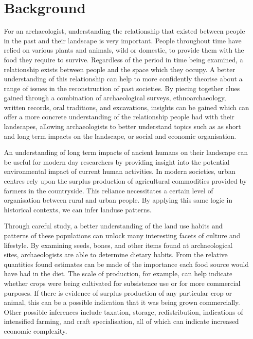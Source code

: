 \section{Background} 

  For an archaeologist, understanding the relationship that existed between
  people in the past and their landscape is very important.  People throughout
  time have relied on various plants and animals, wild or domestic, to provide
  them with the food they require to survive.  Regardless of the period in time
  being examined, a relationship exists between people and the space which they
  occupy.  A better understanding of this relationship can help to more
  confidently theorise about a range of issues in the reconstruction of past
  societies.  By piecing together clues gained through a combination of
  archaeological surveys, ethnoarchaeology, written records, oral traditions, and
  excavations, insights can be gained which can offer a more concrete
  understanding of the relationship people had with their landscapes, allowing
  archaeologists to better understand topics such as as short and long term
  impacts on the landscape, or social and economic organisation. 
  
  An understanding of long term impacts of ancient humans on their landscape can 
  be useful for modern day researchers by providing insight into the potential 
  environmental impact of current human activities. In modern societies, urban 
  centres rely upon the surplus production of agricultural commodities provided 
  by farmers in the countryside.  This reliance necessitates a certain level of 
  organisation between rural and urban people.  By applying this same logic in 
  historical contexts, we can infer landuse patterns.
  
  Through careful study, a better understanding of the land use habits and
  patterns of these populations can unlock many interesting facets of culture and 
  lifestyle.  By examining seeds, bones, and other items found at archaeological
  sites, archaeologists are able to determine dietary habits. From the relative
  quantities found estimates can be made of the importance each food source would
  have had in the diet.  The scale of production, for example, can help indicate 
  whether crops were being cultivated for subsistence use or for more commercial 
  purposes.  If there is evidence of surplus production of any particular crop or
  animal, this can be a possible indication that it was being grown commercially.
  Other possible inferences include taxation, storage, redistribution, indications
  of intensified farming, and craft specialisation, all of which can indicate 
  increased economic complexity.

